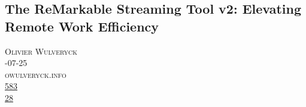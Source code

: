 \documentclass[10pt,a4paper]{article}
\begin{document}
\subsection{The ReMarkable Streaming Tool v2: Elevating Remote Work Efficiency}
\noindent\begin{minipage}[t]{0.20\linewidth}
\vspace{0pt}
\noindent\textsc{\footnotesize
{\scriptsize\faUser}\space 
Olivier Wulveryck \\
{\scriptsize\faCalendar}-07-25 \\
{\scriptsize\faGlobe}\space 
owulveryck.info \\
{\scriptsize\faThumbsOUp}\space 
\href{http://news.ycombinator.com/item?id=37196440\&utm\_term=comment}{583} \\
{\scriptsize\faComments}\space 
\href{http://news.ycombinator.com/item?id=37196440\&utm\_term=comment}{28} \\
}
\end{minipage} 
\end{document}

